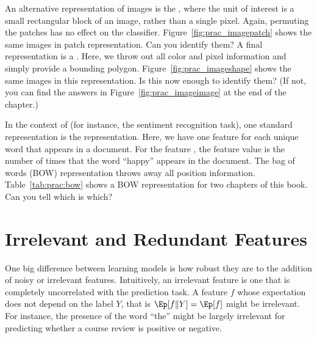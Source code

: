 An alternative representation of images is the , where the unit of interest is a small rectangular
block of an image, rather than a single pixel.  Again, permuting the
patches has no effect on the classifier.
Figure~\ref{fig:prac_imagepatch} shows the same images in patch
representation.  Can you identify them?  A final representation is a
.  Here, we throw out all color and
pixel information and simply provide a bounding polygon.
Figure~\ref{fig:prac_imageshape} shows the same images in this
representation.  Is this now enough to identify them?  (If not, you
can find the answers in Figure~\ref{fig:prac_imageimage} at the end of the chapter.)




    

In the context of  (for instance, the
sentiment recognition task), one standard representation is the
 representation.  Here, we have one feature for
each unique word that appears in a document.  For the feature
, the feature value is the number of times that the word
``happy'' appears in the document.  The bag of words (BOW)
representation throws away all position information.
Table~\ref{tab:prac:bow} shows a BOW representation for two chapters of this book.
Can you tell which is
which?

\section{Irrelevant and Redundant Features}

One big difference between learning models is how robust they are to
the addition of noisy or irrelevant features.  Intuitively, an
irrelevant feature is one that is completely uncorrelated with the
prediction task.  A feature $f$ whose expectation does not depend on
the label $Y$, that is $\Ep[f \| Y] = \Ep[f]$ might be irrelevant.
For instance, the presence of the word ``the'' might be largely irrelevant for
predicting whether a course review is positive or negative.

